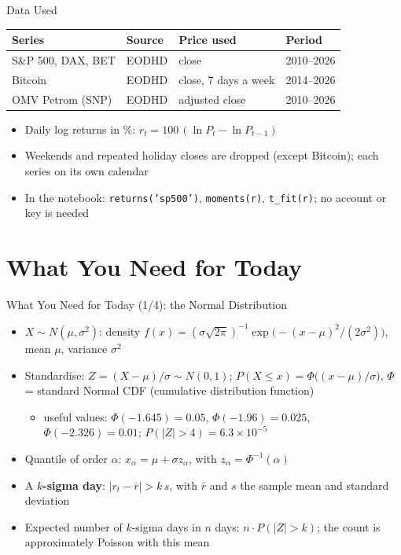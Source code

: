 \begin{frame}{Data Used}
\itemsize{\small}
\begin{center}
\footnotesize
\begin{tabular}{llll}
\toprule
\textbf{Series} & \textbf{Source} & \textbf{Price used} & \textbf{Period} \\
\midrule
S\&P 500, DAX, BET & EODHD & close & 2010--2026 \\
Bitcoin & EODHD & close, 7 days a week & 2014--2026 \\
OMV Petrom (SNP) & EODHD & adjusted close & 2010--2026 \\
\bottomrule
\end{tabular}
\end{center}
\begin{itemize}
    \item Daily log returns in \%: $r_t = 100\,(\ln P_t - \ln P_{t-1})$
    \item Weekends and repeated holiday closes are dropped (except Bitcoin); each series on its own calendar
    \item In the notebook: \texttt{returns('sp500')}, \texttt{moments(r)}, \texttt{t\_fit(r)}; no account or key is needed
\end{itemize}
\end{frame}


\section{What You Need for Today}

\begin{frame}{What You Need for Today (1/4): the Normal Distribution}
\itemsize{\footnotesize}
\begin{itemize}
    \item $X \sim N(\mu, \sigma^2)$: density $f(x) = (\sigma\sqrt{2\pi})^{-1}\exp\big(-(x-\mu)^2/(2\sigma^2)\big)$, mean $\mu$, variance $\sigma^2$
    \item Standardise: $Z = (X - \mu)/\sigma \sim N(0,1)$; $P(X \le x) = \Phi\big((x - \mu)/\sigma\big)$, $\Phi$ = standard Normal CDF (cumulative distribution function)
    \begin{itemize}
        \item useful values: $\Phi(-1.645) = 0.05$, $\Phi(-1.96) = 0.025$, $\Phi(-2.326) = 0.01$; $P(|Z| > 4) = 6.3 \times 10^{-5}$
    \end{itemize}
    \item Quantile of order $\alpha$: $x_\alpha = \mu + \sigma z_\alpha$, with $z_\alpha = \Phi^{-1}(\alpha)$
    \item A \textbf{$k$-sigma day}: $|r_t - \bar r| > k\,s$, with $\bar r$ and $s$ the sample mean and standard deviation
    \item Expected number of $k$-sigma days in $n$ days: $n \cdot P(|Z| > k)$; the count is approximately Poisson with this mean
\end{itemize}
\end{frame}

